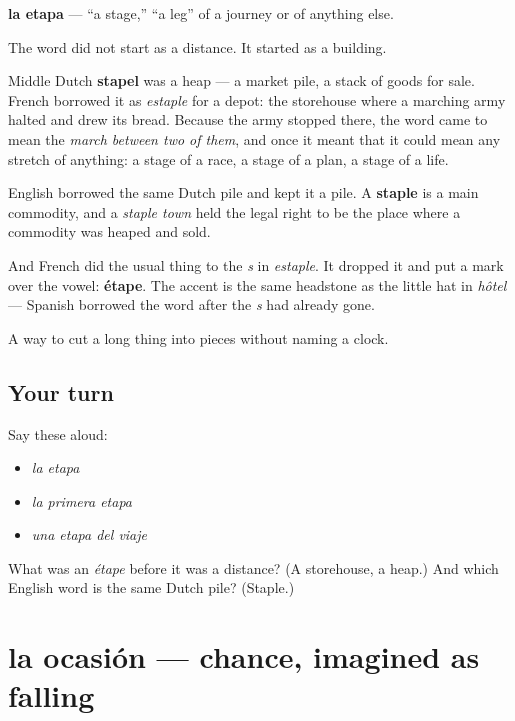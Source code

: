 \begin{cousinweb}
\textbf{la etapa} — \textquotedblleft{}a stage,\textquotedblright{} \textquotedblleft{}a leg\textquotedblright{} of a journey or of anything else.

The word did not start as a distance. It started as a building.

Middle Dutch \textbf{stapel} was a heap — a market pile, a stack of goods for sale. French borrowed it as \emph{estaple} for a depot: the storehouse where a marching army halted and drew its bread. Because the army stopped there, the word came to mean the \emph{march between two of them}, and once it meant that it could mean any stretch of anything: a stage of a race, a stage of a plan, a stage of a life.

English borrowed the same Dutch pile and kept it a pile. A \textbf{staple} is a main commodity, and a \emph{staple town} held the legal right to be the place where a commodity was heaped and sold.

And French did the usual thing to the \emph{s} in \emph{estaple}. It dropped it and put a mark over the vowel: \textbf{étape}. The accent is the same headstone as the little hat in \emph{hôtel} — Spanish borrowed the word after the \emph{s} had already gone.
\end{cousinweb}

\begin{grammarlens}[title={What you've built}]
A way to cut a long thing into pieces without naming a clock.
\end{grammarlens}

\subsection*{Your turn}
Say these aloud:

\begin{itemize}
\raggedright
  \item \emph{la etapa}
  \item \emph{la primera etapa}
  \item \emph{una etapa del viaje}
\end{itemize}

\begin{tcolorbox}[breakable,colback=teal!4,colframe=teal!35!black,title={Before you move on}]
What was an \emph{étape} before it was a distance? (A storehouse, a heap.) And which English word is the same Dutch pile? (Staple.)
\end{tcolorbox}
\section[la ocasión]{la ocasión — chance, imagined as falling}

